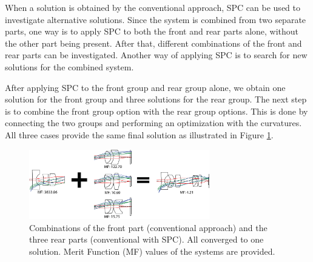 When a solution is obtained by the conventional approach, SPC can be used to investigate alternative solutions. Since the system is combined from two separate parts, one way is to apply SPC to both the front and rear parts alone, without the other part being present. After that, different combinations of the front and rear parts can be investigated. Another way of applying SPC is to search for new solutions for the combined system.

After applying SPC to the front group and rear group alone, we obtain one solution for the front group and three solutions for the rear group. The next step is to combine the front group option with the rear group options. This is done by connecting the two groups and performing an optimization with the curvatures. All three cases provide the same final solution as illustrated in Figure \ref{fig:WAL_combine}.

\begin{figure}[h!]
    \centering
    \includegraphics[width=0.7\textwidth]{chapter-4/figures/WAL_combine.png}
    \caption{Combinations of the front part (conventional approach) and the three rear parts (conventional with SPC). All converged to one solution. Merit Function (MF) values of the systems are provided. }
    \label{fig:WAL_combine}
\end{figure}

